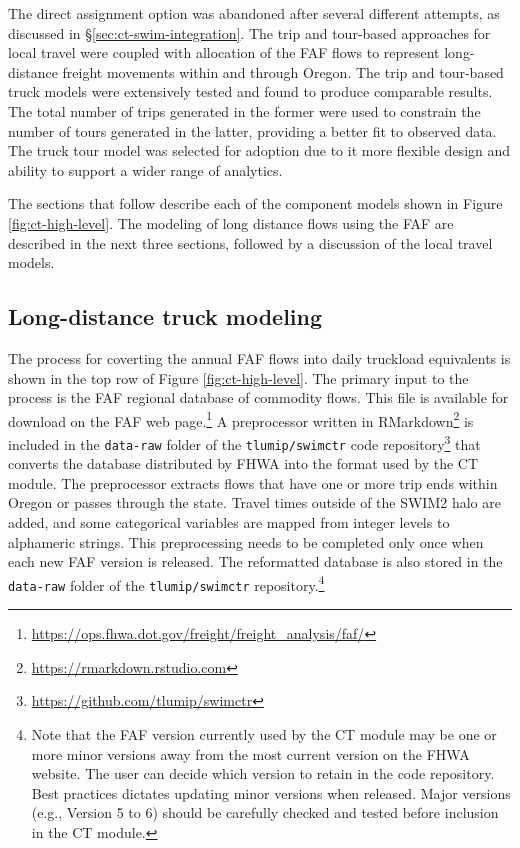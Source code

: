 \noindent The direct assignment option was abandoned after several different attempts, as discussed in \S\ref{sec:ct-swim-integration}. The trip and tour-based approaches for local travel were coupled with allocation of the FAF flows to represent long-distance freight movements within and through Oregon. The trip and tour-based truck models were extensively tested and found to produce comparable results. The total number of trips generated in the former were used to constrain the number of tours generated in the latter, providing a better fit to observed data. The truck tour model was selected for adoption due to it more flexible design and ability to support a wider range of analytics.

The sections that follow describe each of the component models shown in Figure \ref{fig:ct-high-level}. The modeling of long distance flows using the FAF are described in the next three sections, followed by a discussion of the local travel models. 

\subsection{Long-distance truck modeling}\label{sec:long-distance-models}

The process for coverting the annual FAF flows into daily truckload equivalents is shown in the top row of Figure \ref{fig:ct-high-level}. The primary input to the process is the FAF regional database of commodity flows. This file is available for download on the FAF web page.\footnote{\url{https://ops.fhwa.dot.gov/freight/freight_analysis/faf/}} A preprocessor written in RMarkdown\footnote{\url{https://rmarkdown.rstudio.com}} is included in the \verb|data-raw| folder of the \verb|tlumip/swimctr| code repository\footnote{\url{https://github.com/tlumip/swimctr}} that converts the database distributed by FHWA into the format used by the CT module. The preprocessor extracts flows that have one or more trip ends within Oregon or passes through the state. Travel times outside of the SWIM2 halo are added, and some categorical variables are mapped from integer levels to alphameric strings. This preprocessing needs to be completed only once when each new FAF version is released. The reformatted database is also stored in the \verb|data-raw| folder of the \verb|tlumip/swimctr| repository.\footnote{Note that the FAF version currently used by the CT module may be one or more minor versions away from the most current version on the FHWA website. The user can decide which version to retain in the code repository. Best practices dictates updating minor versions when released. Major versions (e.g., Version 5 to 6) should be carefully checked and tested before inclusion in the CT module.}

